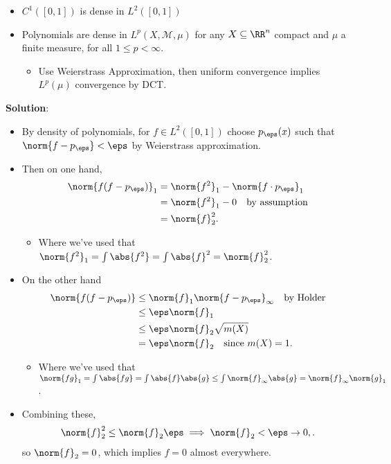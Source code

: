 \begin{solution}
\begin{itemize}
\tightlist
\item
  \(C^1([0, 1])\) is dense in \(L^2([0, 1])\)
\item
  Polynomials are dense in \(L^p(X, \mathcal{M}, \mu)\) for any
  \(X\subseteq \RR^n\) compact and \(\mu\) a finite measure, for all
  \(1\leq p < \infty\).

  \begin{itemize}
  \tightlist
  \item
    Use Weierstrass Approximation, then uniform convergence implies
    \(L^p(\mu)\) convergence by DCT.
  \end{itemize}
\end{itemize}

\textbf{Solution}:

\begin{itemize}
\item
  By density of polynomials, for \(f\in L^2([0, 1])\) choose
  \(p_\eps(x)\) such that \(\norm{f - p_\eps} < \eps\) by Weierstrass
  approximation.
\item
  Then on one hand, \begin{align*}
  \norm{f(f-p_\eps)}_1 
  &= \norm{f^2}_1 - \norm{f\cdot p_\eps}_1 \\
  &= \norm{f^2}_1 - 0 \quad\text{by assumption} \\
  &= \norm{f}_2^2
  .\end{align*}

  \begin{itemize}
  \tightlist
  \item
    Where we've used that
    \(\norm{f^2}_1 = \int \abs{f^2} = \int \abs{f}^2 = \norm{f}_2^2\).
  \end{itemize}
\item
  On the other hand \begin{align*}
  \norm{f(f-p_\eps)} 
  &\leq \norm{f}_1 \norm{f-p_\eps}_\infty \quad\text{by Holder} \\
  &\leq \eps \norm{f}_1  \\
  &\leq \eps \norm{f}_2 \sqrt{m(X)} \\ 
  &= \eps \norm{f}_2 \quad\text{since } m(X)= 1
  .\end{align*}

  \begin{itemize}
  \tightlist
  \item
    Where we've used that
    \(\norm{fg}_1 = \int \abs{fg} = \int \abs{f}\abs{g} \leq \int \norm{f}_\infty \abs{g} = \norm{f}_\infty \norm{g}_1\).
  \end{itemize}
\item
  Combining these, \begin{align*}
  \norm{f}_2^2 \leq \norm{f}_2 \eps \implies \norm{f}_2 < \eps \to 0,
  .\end{align*} so \(\norm{f}_2 = 0\), which implies \(f=0\) almost
  everywhere.
\end{itemize}

\end{solution}

